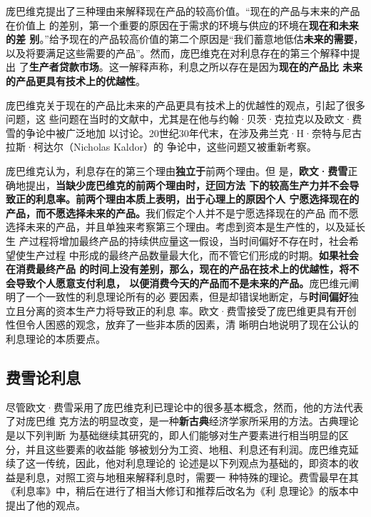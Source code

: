 庞巴维克提出了三种理由来解释现在产品的较高价值。“现在的产品与末来的产品在价值上
的差别，第一个重要的原因在于需求的环境与供应的环境在\textbf{现在和未来的差
  别}。”给予现在的产品较高价值的第二个原因是“我们蓄意地低估\textbf{未来的需要}，
以及将要满足这些需要的产品”。然而，庞巴维克在对利息存在的第三个解释中提出
了\textbf{生产者贷款市场}。这一解释声称，利息之所以存在是因为\textbf{现在的产品比
  未来的产品更具有技术上的优越性}。

庞巴维克关于现在的产品比未来的产品更具有技术上的优越性的观点，引起了很多问题，这
些问题在当时的文献中，尤其是在他与约翰·贝茨·克拉克以及欧文·费雪的争论中被广泛地加
以讨论。20世纪30年代末，在涉及弗兰克·H·奈特与尼古拉斯·柯达尔（Nicholas Kaldor）的
争论中，这些问题又被重新考察。

庞巴维克认为，利息存在的第三个理由\textbf{独立于}前两个理由。但
是，\textbf{欧文·费雪}正确地提出，\textbf{当缺少庞巴维克的前两个理由时，迂回方法
  下的较高生产力并不会导致正的利息率。前两个理由本质上表明，出于心理上的原因个人
  宁愿选择现在的产品，而不愿选择未来的产品。}我们假定个人并不是宁愿选择现在的产品
而不愿选择未来的产品，并且单独来考察第三个理由。考虑到资本是生产性的，以及延长生
产过程将增加最终产品的持续供应量这一假设，当时间偏好不存在时，社会希望使生产过程
中形成的最终产品数量最大化，而不管它们形成的时期。\textbf{如果社会在消费最终产品
  的时间上没有差别，那么，现在的产品在技术上的优越性，将不会导致个人愿意支付利息，
  以便消费今天的产品而不是未来的产品。}庞巴维元阐明了一个一致性的利息理论所有的必
要因素，但是却错误地断定，与\textbf{时间偏好}独立且分离的资本生产力将导致正的利息
率。欧文·费雪接受了庞巴维更具有开创性但令人困惑的观念，放弃了一些非本质的因素，清
晰明白地说明了现在公认的利息理论的本质要点。

\subsection{费雪论利息}

尽管欧文·费雪采用了庞巴维克利已理论中的很多基本概念，然而，他的方法代表了对庞巴维
克方法的明显改变，是一种\textbf{新古典}经济学家所采用的方法。古典理论是以下列判断
为基础继续其研究的，即人们能够对生产要素进行相当明显的区分，并且这些要素的收益能
够被划分为工资、地租、利息还有利润。庞巴维克延续了这一传统，因此，他对利息理论的
论述是以下列观点为基础的，即资本的收益是利息，对照工资与地租来解释利息时，需要一
种特殊的理论。费雪最早在其《利息率》中，稍后在进行了相当大修订和推荐后改名为《利
息理论》的版本中提出了他的观点。

